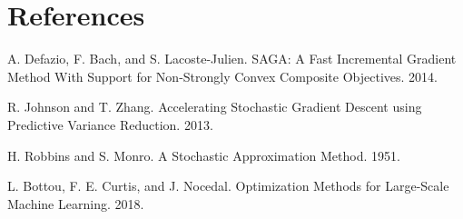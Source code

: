 \documentclass{article}
\begin{document}
{
\small
\section*{References}

\noindent [1] A. Defazio, F. Bach, and S. Lacoste-Julien. SAGA: A Fast
Incremental Gradient Method With Support for Non-Strongly Convex Composite
Objectives. 2014.

\noindent [2] R. Johnson and T. Zhang. Accelerating Stochastic Gradient Descent
using Predictive Variance Reduction. 2013.

\noindent [3] H. Robbins and S. Monro. A Stochastic Approximation Method. 1951.

\noindent [4] L. Bottou, F. E. Curtis, and J. Nocedal. Optimization Methods for
Large-Scale Machine Learning. 2018.
}
\newpage
\end{document}
